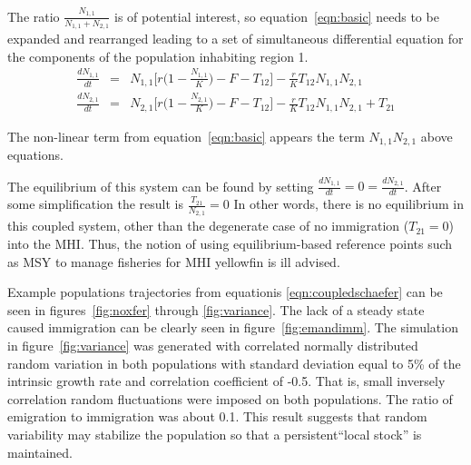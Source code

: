 \documentclass[12pt,letterpaper]{article}
\newcommand\None{{N_{1,1}}}
\newcommand\Ntwo{{N_{2,1}}}
\newcommand\Nsum{{N_{1,1}+N_{2,1}}}
\begin{document}
The ratio $\frac{\None}{\Nsum}$ is of potential interest, so
equation~\ref{eqn:basic} needs to be expanded and rearranged
leading to a set of simultaneous differential equation for the
components of the population inhabiting region 1.
\begin{eqnarray}
\frac{d\None}{dt}&=&\None\Big[r\Big(1-\frac{\None}{K}\Big)
-F - T_{12}\Big] - \frac{r}{K}T_{12}\None\Ntwo\nonumber\\
\frac{d\Ntwo}{dt}&=&\Ntwo\Big[r\Big(1-\frac{\Ntwo}{K}\Big)
-F - T_{12}\Big] - \frac{r}{K}T_{12}\None\Ntwo + T_{21}
\label{eqn:coupledschaefer}
\end{eqnarray}

The non-linear term from equation~\ref{eqn:basic} appears the term
$\None\Ntwo$ above equations.

The equilibrium of this system can be found by setting
$\frac{d\None}{dt} = 0 = \frac{d\Ntwo}{dt}$. After some simplification
the result is $\frac{T_{21}}{\Ntwo} = 0$ In other words, there is no
equilibrium in this coupled system, other than the degenerate case of
no immigration ($T_{21}=0$) into the MHI. Thus, the notion of using
equilibrium-based reference points such as MSY to manage fisheries for
MHI yellowfin is ill advised.

Example populations trajectories from equationis \ref{eqn:coupledschaefer}
can be seen in figures~\ref{fig:noxfer} through \ref{fig:variance}.
The lack of a steady state caused immigration can be clearly seen in
figure~\ref{fig:emandimm}.
The simulation in figure~\ref{fig:variance} was generated with
correlated normally distributed random variation in both populations
with standard deviation equal to 5\% of the intrinsic growth
rate and correlation coefficient of -0.5. That is, small inversely
correlation random fluctuations were imposed on both populations.
The ratio of emigration to immigration was about 0.1. This result
suggests that random variability may stabilize the population so that a
persistent``local stock'' is maintained.
\end{document}

